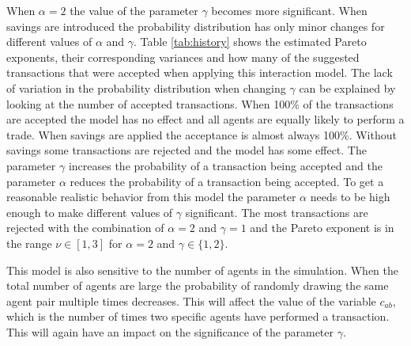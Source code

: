 \documentclass{article}
\begin{document}
When $\alpha=2$ the value of the parameter $\gamma$ becomes more significant. When savings are introduced the probability distribution has only minor changes for different values of $\alpha$ and $\gamma$. Table \ref{tab:history} shows the estimated Pareto exponents, their corresponding variances and how many of the suggested transactions that were accepted when applying this interaction model. The lack of variation in the probability distribution when changing $\gamma$ can be explained by looking at the number of accepted transactions. When 100\% of the transactions are accepted the model has no effect and all agents are equally likely to perform a trade. When savings are applied the acceptance is almost always 100\%. Without savings some transactions are rejected and the model has some effect. The parameter $\gamma$ increases the probability of a transaction being accepted and the parameter $\alpha$ reduces the probability of a transaction being accepted. To get a reasonable realistic behavior from this model the parameter $\alpha$ needs to be high enough to make different values of $\gamma$ significant. The most transactions are rejected with the combination of $\alpha=2$ and $\gamma=1$ and the Pareto exponent is in the range $\nu \in [1,3]$ for $\alpha=2$ and $\gamma \in \{1,2\}$. 

This model is also sensitive to the number of agents in the simulation. When the total number of agents are large the probability of randomly drawing the same agent pair multiple times decreases. This will affect the value of the variable $c_{ab}$, which is the number of times two specific agents have performed a transaction. This will again have an impact on the significance of the parameter $\gamma$.
 
\end{document}
